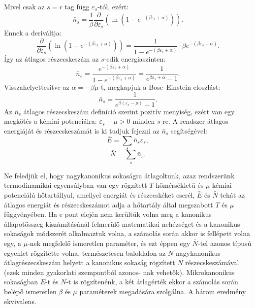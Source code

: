 \documentclass[../main.tex]{subfiles}
\begin{document}
Mivel csak az $s=r$ tag függ $\varepsilon_s$-tól, ezért:
\begin{equation}
    \bar{n}_s = \frac{1}{\beta} \frac{\partial}{\partial \varepsilon_s} \left( \ln (1 - e^{-(\beta \varepsilon_s + \alpha)}) \right).
\end{equation}
Ennek a deriváltja:
\begin{equation}
    \frac{\partial}{\partial \varepsilon_s} \left( \ln (1 - e^{-(\beta \varepsilon_s + \alpha)}) \right) = \frac{1}{1 - e^{-(\beta \varepsilon_s + \alpha)}} \cdot \beta e^{-(\beta \varepsilon_s + \alpha)}.
\end{equation}
Így az átlagos részecskeszám az $s$-edik energiaszinten:
\begin{equation}
    \bar{n}_s = \frac{e^{-(\beta \varepsilon_s + \alpha)}}{1 - e^{-(\beta \varepsilon_s + \alpha)}} = \frac{1}{e^{\beta \varepsilon_s + \alpha} - 1}.
\end{equation}
Visszahelyettesítve az $\alpha = - \beta \mu$-t, megkapjuk a Bose–Einstein eloszlást:
\begin{equation}
    \boxed{
    \bar{n}_s = \frac{1}{e^{\beta (\varepsilon_s - \mu)} - 1}.
    }
\end{equation}
Az $\bar{n}_s$ átlagos részecskeszám definíció szerint pozitív menyiség, ezért van egy megkötés a kémiai potenciálra: $\varepsilon_s - \mu > 0$ minden $s$-re.
A rendszer átlagos energiáját és részecskeszámát is ki tudjuk fejezni az $\bar{n}_s$ segítségével:
\begin{equation}
    \bar{E} = \sum_s \bar{n}_s \varepsilon_s,
\end{equation}
\begin{equation}
    \bar{N} = \sum_s \bar{n}_s.
\end{equation}

Ne feledjük el, hogy nagykanonikus sokaságra átlagoltunk, azaz rendszerünk termodinamikai egyensúlyban van egy rögzített $T$ hőmérsékletű és $\mu$ kémiai potenciálú
hőtartállyal, amellyel energiát és részecskéket cserél, $\bar{E}$ és $\bar{N}$ tehát az átlagos
energiát és részecskeszámot adja a hőtartály által megszabott $T$ és $\mu$ függvényében.
Ha e pont elején nem kerültük volna meg a kanonikus állapotösszeg kiszámításánál
felmerülő matematikai nehézséget és a kanonikus sokaságok módszerét alkalmaztuk
volna, a számolás során akkor is fellépett volna egy, a $\mu$-nek megfelelő ismeretlen
paraméter, és ezt éppen egy $\bar{N}$-tel azonos típusú egyenlet rögzítette volna, természetesen baloldalon az $N$ nagykanonikus átlagrészecskeszám helyett a kanonikus
sokaság rögzített $N$ részecskeszámával (ezek minden gyakorlati szempontból azonos-
nak vehetők). Mikrokanonikus sokaságban $E$-t és $N$-t is rögzítenénk, a két átlagérték ekkor a
számolás során belépő ismeretlen $\beta$ és $\mu$ paraméterek megadására szolgálna. A három eredmény ekvivalens.
\end{document}
